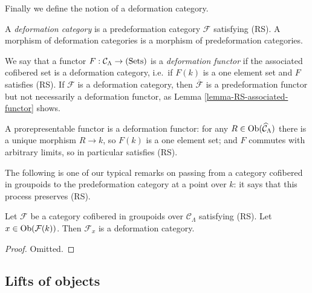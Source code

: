 \noindent
Finally we define the notion of a deformation category.

\begin{definition}
\label{definition-deformation-category}
A {\it deformation category} is a predeformation category $\mathcal F$ 
satisfying (RS).  A morphism of deformation categories is a morphism of 
predeformation categories.
\end{definition}

\begin{remark}
\label{remark-deformation-functor}
We say that a functor $F: \mathcal C_{\Lambda} \rightarrow \textnormal{(Sets)}$ 
is a {\it deformation functor} if the associated cofibered set is a 
deformation category, i.e.\ if $F(k)$ is a one element set and $F$ satisfies 
(RS).  If $\mathcal F$ is a deformation category, then $\overline{\mathcal F}$ 
is a predeformation functor but not necessarily a deformation functor, as
Lemma \ref{lemma-RS-associated-functor} shows.
\end{remark}

\begin{example}
\label{example-prorepresentable-deformation-functor}
A prorepresentable functor is a deformation functor: for any $R \in 
\textnormal{Ob}(\widehat{\mathcal C}_{\Lambda})$ there is a unique morphism $R 
\rightarrow k$, so $F(k)$ is a one element set; and $F$ commutes with arbitrary 
limits, so in particular satisfies (RS).
\end{example}

\noindent
The following is one of our typical remarks on passing from a category 
cofibered in groupoids to the predeformation category at a point over $k$: it 
says that this process preserves (RS).

\begin{lemma}
\label{lemma-localize-RS}
Let $\mathcal F$ be a category cofibered in groupoids over $\mathcal 
C_{\Lambda}$ satisfying \textnormal{(RS)}. Let $x \in \textnormal{Ob}(\mathcal 
F(k))$.  Then $\mathcal F_{x}$ is a deformation category.
\end{lemma}

\begin{proof}
Omitted.
\end{proof}

\subsection{Lifts of objects}
\label{subsection-lifts}

